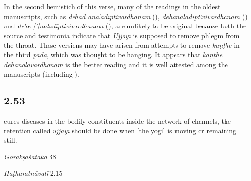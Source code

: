 \begin{ekdosis}
\begin{testimonia}[hp02_052]
\end{testimonia}

\begin{philcomm}[hp02_052]
In the second hemistich of this verse, many of the readings in the oldest manuscripts, such as \emph{dehād analadīptivardhanam} (), \emph{dehānaladīptivivardhanam} () and \emph{dehe [’]naladīptivivardhanam} (), are unlikely to be original because both the source and testimonia indicate that \emph{Ujjāyī} is supposed to remove phlegm from the throat. These versions may have arisen from attempts to remove \emph{kaṇṭhe} in the third \emph{pāda}, which was thought to be hanging. It appears that \emph{kaṇṭhe dehānalavardhanam} is the better reading and it is well attested among the manuscripts (including \textalpha).
\end{philcomm}

\subsection*{2.53}
\begin{translation}[hp02_053]
[and] cures diseases in the bodily constituents inside the network of channels,
the retention called \emph{ujjāyī} should be done when [the yogi] is moving or remaining still.
\end{translation}

\begin{sources}[hp02_053]
\emph{Gorakṣaśataka} 38

\begin{versinnote}
\end{versinnote}
\end{sources}

\begin{testimonia}[hp02_053]
\emph{Haṭharatnāvalī} 2.15

\begin{versinnote}
\tl{nāḍījālodarādhātu° ] nāḍījalodaradhātu° \textup{J,P;} nāḍījalodaraṃ dhātu° \textup{N, n1, n4}\\+}
\end{versinnote}


\end{testimonia}
\end{ekdosis}
